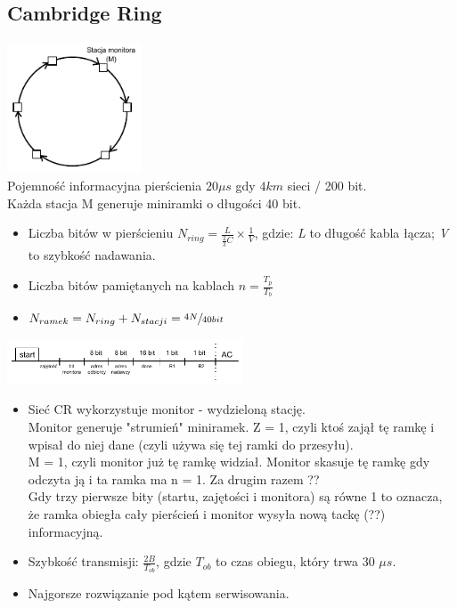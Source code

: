 			\subsection{Cambridge Ring}
				\includegraphics[width=4cm]{./images/image32.pdf}\\
				Pojemność informacyjna pierścienia $ 20\mu{s} $ gdy $ 4km $ sieci / 200 bit.\\
				Każda stacja M generuje miniramki o długości 40 bit.\\
				\begin{itemize}
					\item Liczba bitów w pierścieniu $ N_{ring}=\frac{L}{\frac{2}{3}C}\times \frac{1}{V}$, gdzie: \emph{L} to długość kabla łącza; \emph{V} to szybkość nadawania.
					\item Liczba bitów pamiętanych na kablach $ n=\frac{T_p}{T_b} $
					\item $ N_{ramek}=N_{ring}+N_{stacji}=\sfrac{4N}{40bit}$
				\end{itemize}
				\includegraphics[width=7cm]{./images/image33.pdf}
				\begin{itemize}
					\item Sieć CR wykorzystuje monitor - wydzieloną stację.\\
					Monitor generuje "strumień" miniramek. Z = 1, czyli ktoś zajął tę ramkę i wpisał do niej dane (czyli używa się tej ramki do przesyłu).\\
					M = 1, czyli monitor już tę ramkę widział. Monitor skasuje tę ramkę gdy odczyta ją i ta ramka ma n = 1. Za drugim razem ??\\
					Gdy trzy pierwsze bity (startu, zajętości i monitora) są równe 1 to oznacza, że ramka obiegła cały pierścień i monitor wysyła nową tackę (??) informacyjną.
					\item Szybkość transmisji: $ \frac{2B}{T_{ob}} $, gdzie $ T_{ob} $ to czas obiegu, który trwa 30 $ \mu s $.
					\item Najgorsze rozwiązanie pod kątem serwisowania.
				\end{itemize}
